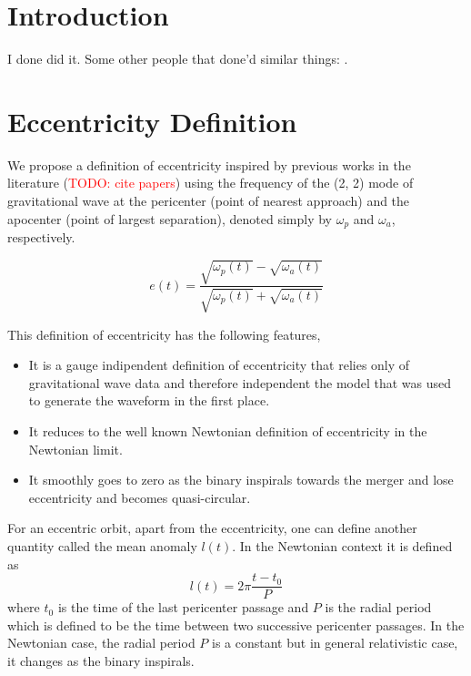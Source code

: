 \documentclass[aps,prd,amsmath,floats,floatfix, twocolumn,
superscriptaddress,nofootinbib,showpacs]{revtex4-1}
\newcommand{\red}{\textcolor{red}}
\newcommand{\TODO}[1]{\red{TODO: #1}}
\begin{document}
\maketitle

\section{Introduction}
\label{sec:introduction}
I done did it. Some other people that done'd similar things:
\cite{Scott:2015rza}.

\section{Eccentricity Definition}
\label{sec:eccentricity_definition}
We propose a definition of eccentricity inspired by previous works in
the literature (\TODO{cite papers}) using the frequency of the (2, 2)
mode of gravitational wave at the pericenter (point of nearest
approach) and the apocenter (point of largest separation), denoted
simply by $\omega_{p}$ and $\omega_{a}$, respectively.

\begin{equation}
\label{eq:eccentricity_definition} e(t) = \frac{\sqrt{\omega_{p}(t)} -
\sqrt{\omega_{a}(t)}}{\sqrt{\omega_{p}(t)} + \sqrt{\omega_{a}(t)}}
\end{equation}

This definition of eccentricity has the following features,
\begin{itemize}
\item It is a gauge indipendent definition of eccentricity that relies
only of gravitational wave data and therefore independent the model
that was used to generate the waveform in the first place.
\item It reduces to the well known Newtonian definition of
eccentricity in the Newtonian limit.
\item It smoothly goes to zero as the binary inspirals towards the
merger and lose eccentricity and becomes quasi-circular.
\end{itemize}

For an eccentric orbit, apart from the eccentricity, one can define
another quantity called the mean anomaly $l(t)$. In the Newtonian
context it is defined as
\begin{equation}
\label{eq:mean_anomaly_definition} l(t) = 2\pi \frac{t - t_0}{P}
\end{equation} where $t_0$ is the time of the last pericenter passage
and $P$ is the radial period which is defined to be the time between
two successive pericenter passages.  In the Newtonian case, the radial
period $P$ is a constant but in general relativistic case, it changes
as the binary inspirals.
\end{document}
